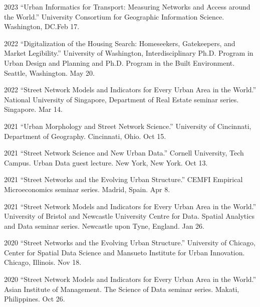 \documentclass[11pt,letterpaper]{report}
\begin{document}
    \begin{tablist}

        \item[2023] \tab{}\enquote{Urban Informatics for Transport: Measuring Networks and Access around the World.} University Consortium for Geographic Information Science. Washington, DC.\@ Feb 17.

        \item[2022] \tab{}\enquote{Digitalization of the Housing Search: Homeseekers, Gatekeepers, and Market Legibility.} University of Washington, Interdisciplinary Ph.D. Program in Urban Design and Planning and Ph.D. Program in the Built Environment. Seattle, Washington. May 20.

        \item[2022] \tab{}\enquote{Street Network Models and Indicators for Every Urban Area in the World.} National University of Singapore, Department of Real Estate seminar series. Singapore. Mar 14.

        \item[2021] \tab{}\enquote{Urban Morphology and Street Network Science.} University of Cincinnati, Department of Geography. Cincinnati, Ohio. Oct 15.

        \item[2021] \tab{}\enquote{Street Network Science and New Urban Data.} Cornell University, Tech Campus. Urban Data guest lecture. New York, New York. Oct 13.

        \item[2021] \tab{}\enquote{Street Networks and the Evolving Urban Structure.} CEMFI Empirical Microeconomics seminar series. Madrid, Spain. Apr 8.

        \item[2021] \tab{}\enquote{Street Network Models and Indicators for Every Urban Area in the World.} University of Bristol and Newcastle University Centre for Data. Spatial Analytics and Data seminar series. Newcastle upon Tyne, England. Jan 26.

        \item[2020] \tab{}\enquote{Street Networks and the Evolving Urban Structure.} University of Chicago, Center for Spatial Data Science and Mansueto Institute for Urban Innovation. Chicago, Illinois. Nov 18.

        \item[2020] \tab{}\enquote{Street Network Models and Indicators for Every Urban Area in the World.} Asian Institute of Management. The Science of Data seminar series. Makati, Philippines. Oct 26.


\end{tablist}
\end{document}
